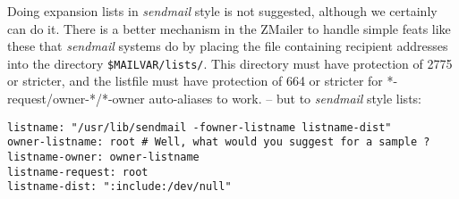 Doing expansion lists in {\em sendmail\/} style is not suggested, although
we certainly can do it.  There is a better mechanism in the ZMailer
to handle simple feats like these that {\em sendmail\/} systems do by placing
the file containing recipient addresses into the directory  
{\tt \$MAILVAR/lists/}.
This directory must have protection of 2775 or stricter, and the listfile
must have protection of 664 or stricter for *-request/owner-*/*-owner
auto-aliases to work. -- but to {\em sendmail\/} style lists:

\begin{tscreen}
\begin{verbatim}
listname: "/usr/lib/sendmail -fowner-listname listname-dist"
owner-listname: root # Well, what would you suggest for a sample ?
listname-owner: owner-listname
listname-request: root
listname-dist: ":include:/dev/null"
\end{verbatim}
\end{tscreen}


